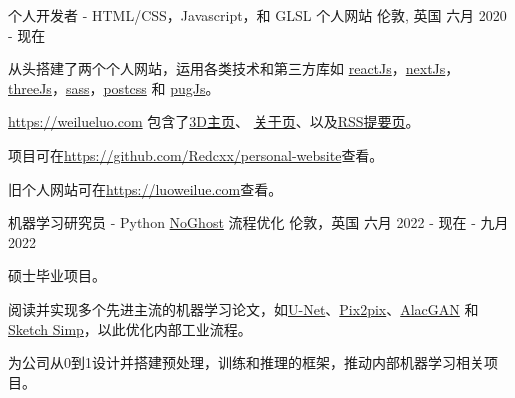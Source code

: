 

\begin{cventries}

  \cventry
    {个人开发者 - HTML/CSS，Javascript，和 GLSL} %
    {个人网站} %
    {伦敦, 英国} %
    {六月 2020 - 现在} %
    {
      \begin{cvitems} %
        \item {从头搭建了两个个人网站，运用各类技术和第三方库如 \href{https://reactjs.org/}{reactJs}，\href{https://nextjs.org/}{nextJs}，\href{https://threejs.org/}{threeJs}，\href{https://sass-lang.com/}{sass}，\href{https://postcss.org/}{postcss} 和 \href{https://pugjs.org/api/getting-started.html}{pugJs}。}
        \item {\href{https://weilueluo.com}{https://weilueluo.com} 包含了\href{https://weilueluo.com}{3D主页}、 \href{https://weilueluo.com/about.html}{关于页}、以及\href{https://weilueluo.com/rss.html}{RSS提要页}。}
        \item {项目可在\href{https://github.com/Redcxx/personal-website}{https://github.com/Redcxx/personal-website}查看。}
        \item {旧个人网站可在\href{https://luoweilue.com}{https://luoweilue.com}查看。}
      \end{cvitems}
    }

  \cventry
    {机器学习研究员 - Python} %
    {\href{https://www.noghost.co.uk/}{NoGhost} 流程优化} %
    {伦敦，英国} %
    {六月 2022 - 现在 - 九月 2022} %
    {
      \begin{cvitems} %
        \item {硕士毕业项目。}
        \item {阅读并实现多个先进主流的机器学习论文，如\href{https://arxiv.org/abs/1505.04597}{U-Net}、\href{https://arxiv.org/pdf/1611.07004.pdf}{Pix2pix}、\href{https://arxiv.org/abs/1808.03240}{AlacGAN} 和 \href{https://esslab.jp/~ess/en/research/sketch/}{Sketch Simp}，以此优化内部工业流程。}
        \item {为公司从0到1设计并搭建预处理，训练和推理的框架，推动内部机器学习相关项目。}
      \end{cvitems}
    }
    

\end{cventries}
